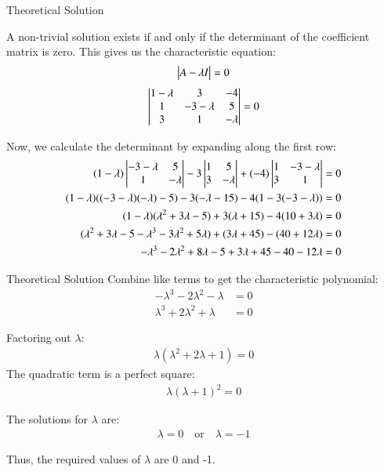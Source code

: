 \documentclass{beamer}
\begin{document}
\begin{frame}{Theoretical Solution}

A non-trivial solution exists if and only if the determinant of the coefficient matrix is zero. This gives us the characteristic equation:
\begin{align}
\begin{vmatrix}A - \lambda I\end{vmatrix} = 0
\end{align}
\begin{align}
\begin{vmatrix}
1-\lambda & 3 & -4 \\
1 & -3-\lambda & 5 \\
3 & 1 & -\lambda
\end{vmatrix}= 0
\end{align}

Now, we calculate the determinant by expanding along the first row:
\begin{align}
(1-\lambda) \begin{vmatrix}-3-\lambda & 5 \\ 1 & -\lambda\end{vmatrix} - 3 \begin{vmatrix} 1 & 5 \\ 3 & -\lambda \end{vmatrix} + (-4) \begin{vmatrix} 1 & -3-\lambda \\ 3 & 1 \end{vmatrix} &=0 \\
(1-\lambda)((-3-\lambda)(-\lambda) - 5) - 3(-\lambda - 15) - 4(1 - 3(-3-\lambda)) &= 0\\
(1-\lambda)(\lambda^2 + 3\lambda - 5) + 3(\lambda + 15) - 4(10 + 3\lambda) &= 0\\
(\lambda^2 + 3\lambda - 5 - \lambda^3 - 3\lambda^2 + 5\lambda) + (3\lambda + 45) - (40 + 12\lambda) &= 0\\
-\lambda^3 - 2\lambda^2 + 8\lambda - 5 + 3\lambda + 45 - 40 - 12\lambda &= 0
\end{align}
\end{frame}
\begin{frame}{Theoretical Solution}
Combine like terms to get the characteristic polynomial:
\begin{align}
-\lambda^3 - 2\lambda^2 - \lambda &= 0 \\
\lambda^3 + 2\lambda^2 + \lambda &= 0
\end{align}

Factoring out $\lambda$:
\begin{align}
\lambda(\lambda^2 + 2\lambda + 1) = 0
\end{align}
The quadratic term is a perfect square:
\begin{align}
\lambda(\lambda + 1)^2 = 0
\end{align}

The solutions for $\lambda$ are:
\begin{align}
\lambda = 0 \quad \text{or} \quad \lambda = -1
\end{align}

Thus, the required values of $\lambda$ are 0 and -1.

\end{frame}
\end{document}
